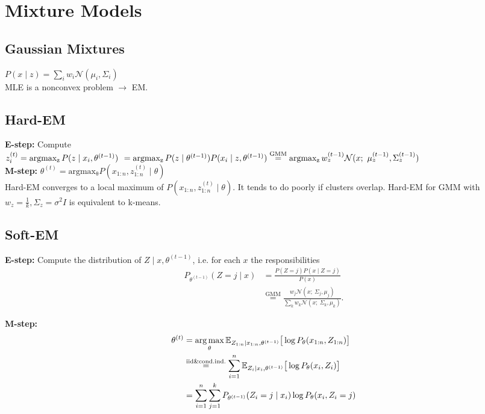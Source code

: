 \section*{Mixture Models}
\subsection*{Gaussian Mixtures}
$P(x\mid z) = \sum_iw_i\mathcal{N}({\mu}_i, {\Sigma}_i)$\\
MLE is a nonconvex problem $\rightarrow$ EM.

\subsection*{Hard-EM}
\textbf{E-step: } Compute \\$z_i^{(t)} = \operatorname{argmax_z} P(z\mid x_i, \theta^{(t-1)})\\
\hspace*{1.4mm}= \operatorname{argmax_z} P(z\mid \theta^{(t-1)}) P(x_i\mid z,\theta^{(t-1)})\\
 \stackrel{\text{GMM}}{=}\operatorname{argmax_z} w_z^{(t-1)}\mathcal{N}(x;\ \mu_z^{(t-1)},\Sigma_z^{(t-1)})$\\
\textbf{M-step: }
$\theta^{(t)} = \operatorname{argmax_\theta} P(x_{1:n},z^{(t)}_{1:n}\mid \theta)$\\
Hard-EM converges to a local maximum
of $P(x_{1:n},z^{(t)}_{1:n}\mid \theta)$. It tends to do poorly if clusters overlap. 
Hard-EM for GMM with $w_z=\frac{1}{k}, \Sigma_z=\sigma^2{I}$
is equivalent to k-means.

\subsection*{Soft-EM}
\textbf{E-step: \newline} Compute the distribution 
of $Z\mid x,\theta^{(t-1)}$, i.e. for each $x$ the responsibilities
\begin{equation*}
    \begin{aligned}
        \!\!\!\!\!\!\!\!\!\!\!\!\!\!\!\!\!\!\!\!\!
        P_{\theta^{(t-1)}}(Z=j\mid x) &= \frac{P(Z=j)P(x\mid Z=j)}{P(x)} \\
        &\stackrel{\text{GMM}}{=}
        \frac{w_j \mathcal{N}(x;\ \Sigma_j,\mu_j)}{\sum_k w_k \mathcal{N}(x;\ \Sigma_k,\mu_k)}.
    \end{aligned}
\end{equation*}

\textbf{M-step:} 
\begin{equation*}
    \begin{aligned}
        \theta^{(t)}&=\operatorname*{arg\,max}_\theta 
        \mathbb{E}_{Z_{1:n}\mid x_{1:n},\theta^{(t-1)}}
        \big[\log P_\theta(x_{1:n},Z_{1:n})\big]\\
        &\stackrel{\text{iid\&cond.ind.}}{=}
        \sum_{i=1}^n \mathbb{E}_{Z_i\mid x_i,\theta^{(t-1)}}
        \big[\log P_\theta(x_i,Z_i)\big] \\
        &= \sum_{i=1}^n \sum_{j=1}^k P_{\theta^{(t-1)}}(Z_i=j\mid x_i)\log P_\theta(x_i,Z_i=j)
    \end{aligned}
\end{equation*}

